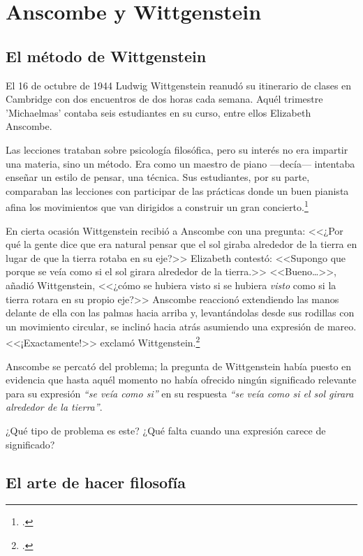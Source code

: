 \section{Anscombe y Wittgenstein}

\subsection{El método de Wittgenstein}
El 16 de octubre de 1944 Ludwig Wittgenstein reanudó su itinerario de clases en
Cambridge con dos encuentros de dos horas cada semana. Aquél trimestre
'Michaelmas' contaba seis estudiantes en su curso, entre ellos Elizabeth
Anscombe. 

Las lecciones trataban sobre psicología filosófica, pero su interés no era
impartir una materia, sino un método. Era como un maestro de piano ---decía---
intentaba enseñar un estilo de pensar, una técnica. Sus estudiantes, por su
parte, comparaban las lecciones con participar de las prácticas donde un buen
pianista afina los movimientos que van dirigidos a construir un gran
concierto.\footcite[p.~357]{pubnpriv}

En cierta ocasión Wittgenstein recibió a Anscombe con una pregunta: <<¿Por qué
la gente dice que era natural pensar que el sol giraba alrededor de la tierra en
lugar de que la tierra rotaba en su eje?>> Elizabeth contestó: <<Supongo que
porque se veía como si el sol girara alrededor de la tierra.>> <<Bueno\ldots>>,
añadió Wittgenstein, <<¿cómo se hubiera visto si se hubiera \emph{visto} como si
la tierra rotara en su propio eje?>> Anscombe reaccionó extendiendo las manos
delante de ella con las palmas hacia arriba y, levantándolas desde sus rodillas
con un movimiento circular, se inclinó hacia atrás asumiendo una expresión de
mareo. <<¡Exactamente!>> exclamó Wittgenstein.\footcite[cf.~][p.~151]{IWT}

Anscombe se percató del problema; la pregunta de Wittgenstein había puesto en
evidencia que hasta aquél momento no había ofrecido ningún significado relevante
para su expresión \emph{``se veía como si''} en su respuesta \emph{``se veía
  como si el sol girara alrededor de la tierra''}.

¿Qué tipo de problema es este? ¿Qué falta cuando una expresión carece de
significado?

\subsection{El arte de hacer filosofía}

